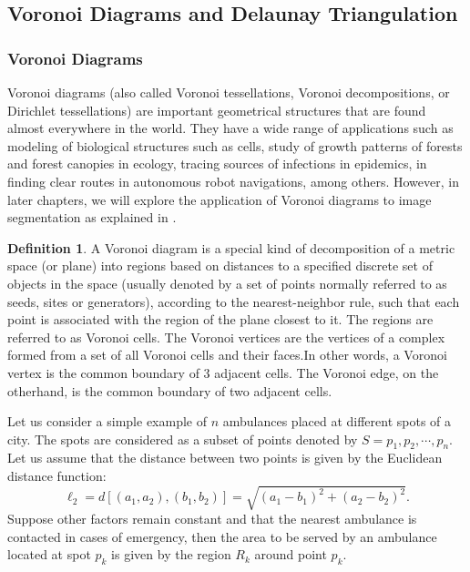 \documentclass[10pt,a4paper]{article}
\theoremstyle{plain}
\theoremstyle{definition}
\newtheorem{defn}[subsection]{Definition}
\begin{document}
     \subsection{Voronoi Diagrams and Delaunay Triangulation} \subsubsection{Voronoi Diagrams }  
     Voronoi diagrams (also called Voronoi tessellations, Voronoi
     decompositions, or Dirichlet tessellations) are important geometrical structures that are found almost everywhere in the world. They have a wide range of applications such as modeling of biological structures such as cells, study of growth patterns of forests and forest canopies in ecology, tracing sources of infections in epidemics, in finding clear routes in autonomous robot navigations, among others. However, in later chapters, we will explore the application of Voronoi diagrams to image segmentation as explained in \citep{stoica2011delaunay}.
     \\
     \begin{defn}
     	A Voronoi diagram is a special kind of decomposition of a metric space (or plane) into regions based on distances to a specified discrete set of objects in the space (usually denoted by a
     	set of points normally referred to as seeds, sites or generators), according to the nearest-neighbor rule, such that each point is associated with the region of the plane closest to it. The regions are referred to as Voronoi cells. The Voronoi vertices are the vertices of a complex formed from a set of all Voronoi cells and their faces.In other words, a Voronoi vertex is the common boundary of 3 adjacent cells. The Voronoi edge, on the otherhand, is the common boundary of two adjacent cells.
     \end{defn}
     Let us consider a simple example of $n$ ambulances placed at different spots of a city. The spots are considered as a subset of points denoted by $S = {p_1, p_2, \cdots, p_n}$. Let us assume that the distance between two points is given by the Euclidean distance function:
      \begin{equation}
      \ell_2 = d[(a_1,a_2),(b_1,b_2)] = \sqrt{(a_1 -b_1)^2 + (a_2 -b_2)^2}.
      \end{equation} Suppose other factors remain constant and that the nearest ambulance is contacted in cases of emergency, then the area to be served by an ambulance located at spot $p_k$ is given by the region $R_k$ around point $p_k$.
      
\end{document}
